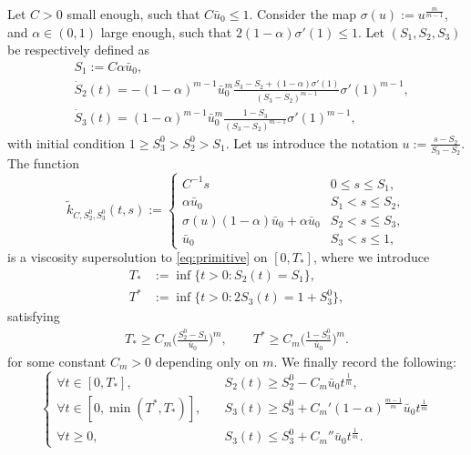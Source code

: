 \documentclass[10pt,a4paper]{amsart}
\newcommand{\al}{\alpha}
\begin{document}
\begin{lemma}\label{lemma:supersolution}
    Let $C>0$ small enough, such that $C\bar u_0 \le 1$. Consider the map $ \sigma(u) := u^\frac{m}{m-1}$, and $\al \in (0,1)$ large enough, such that $2(1-\al)\sigma'(1)\le 1$. Let $(S_1,S_2,S_3)$ be respectively defined as
    \begin{align*}
        &S_1 := C\al \bar u_0,\\ 
        &\dot S_2 (t) = -(1-\al)^{m-1}\bar u_0^m \frac{S_3-S_2 + (1-\al)\sigma'(1) }{(S_3-S_2)^{m-1}}\sigma'(1)^{m-1},  \\
        &\dot S_3 (t) = (1-\al)^{m-1}\bar u_0^m \frac{1-S_3}{(S_3-S_2)^{m-1}}\sigma'(1)^{m-1},
    \end{align*}
    with initial condition $1\ge S_3^0> S_2^0> S_1$. Let us introduce the notation $\displaystyle u := \frac{s-S_2}{S_3-S_2}$. The function
    \begin{equation*}
     \tilde k_{C,S_2^0,S_3^0}(t,s) := \begin{cases}
        C^{-1}s & 0\le s \le S_1, \\
        \al \bar u_0 & S_1 < s \le S_2, \\
    \sigma(u) (1-\al )\bar u_0 + \al \bar u_0 & S_2 < s \le S_3, \\
    \bar u_0  & S_3 < s \le 1,
    \end{cases}
    \end{equation*}
    is a viscosity supersolution to \eqref{eq:primitive} on $[0,T_*]$, where we introduce
    \begin{align*}
        T_* &:= \inf\{t>0 : S_2(t) = S_1\},\\
         T^* &:=\inf\{t>0 : 2S_3(t) = 1 +S_3^0\},
    \end{align*}
    satisfying
    \begin{align*}
        T_* \ge C_m\bigg(\frac{S_2^0-S_1}{\bar u_0}\bigg)^m, \qquad
        T^* \ge C_m\bigg(\frac{1-S_3^0}{\bar u_0}\bigg)^m .
    \end{align*}
    for some constant $C_m>0$ depending only on $m$. 
    We finally record the following:
    \begin{equation*}
    \begin{cases}
      \forall t\in [0,T_*], &\quad S_2(t) \ge  S_2^0 - C_m\bar u_0 t^\frac{1}{m} , \\
      \forall t\in [0,\min(T^*,T_*)],&\quad  S_3(t) \ge S_3^0 + C_m' (1-\al)^{\frac{m-1}{m}} \bar u_0 t^\frac{1}{m}  \\
     \forall t\ge 0, &\quad S_3(t) \le S_3^0 + C_m'' \bar u_0 t^\frac{1}{m}.
    \end{cases}
    \end{equation*}
    
\end{lemma}
\end{document}
